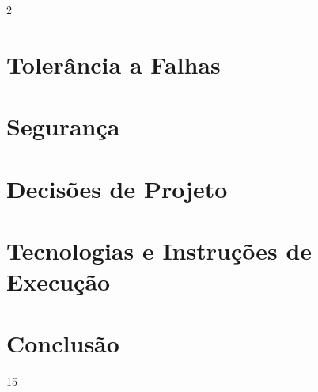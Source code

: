 \documentclass[a4paper]{article}
\begin{document}
\begin{multicols}{2}
\section{Tolerância a Falhas}

\section{Segurança}

\section{Decisões de Projeto}

\section{Tecnologias e Instruções de Execução}

\section{Conclusão}

\renewcommand{\refname}{Referências}
\begin{thebibliography}{15}


\end{thebibliography}

\end{multicols}
\end{document}
